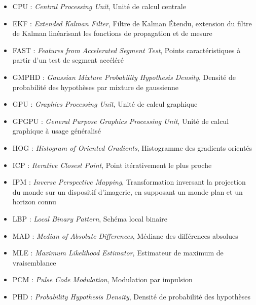 \begin{itemize}
\item {CPU : \emph{Central Processing Unit}, Unité de calcul centrale\\}
\item {EKF : \emph{Extended Kalman Filter}, Filtre de Kalman Étendu, extension du filtre de Kalman linéarisant les fonctions de propagation et de mesure	\\}
\item {FAST : \emph{Features from Accelerated Segment Test}, Points caractéristiques à partir d'un test de segment accéléré	\\}
\item {GMPHD : \emph{Gaussian Mixture Probability Hypothesis Density}, Densité de probabilité des hypothèses par mixture de gaussienne\\}
\item {GPU : \emph{Graphics Processing Unit}, Unité de calcul graphique\\}
\item {GPGPU : \emph{General Purpose Graphics Processing Unit}, Unité de calcul graphique à usage généralisé\\}
\item {HOG : \emph{Histogram of Oriented Gradients}, Histogramme des gradients orientés\\}
\item {ICP : \emph{Iterative Closest Point}, Point itérativement le plus proche\\}
\item {IPM : \emph{Inverse Perspective Mapping}, Transformation inversant la projection du monde sur un dispositif d'imagerie, en supposant un monde plan et un horizon connu\\}
\item {LBP : \emph{Local Binary Pattern}, Schéma local binaire\\}
\item {MAD : \emph{Median of Absolute Differences}, Médiane des différences absolues\\}
\item {MLE	: \emph{Maximum Likelihood Estimator}, Estimateur de maximum de vraisemblance\\}
\item {PCM : \emph{Pulse Code Modulation}, Modulation par impulsion\\}
\item {PHD : \emph{Probability Hypothesis Density}, Densité de probabilité des hypothèses\\}

\end{itemize}
